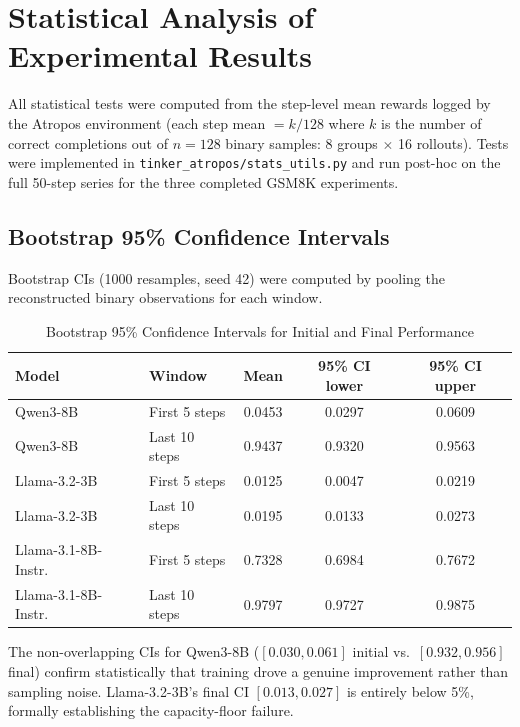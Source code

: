 \documentclass[12pt,a4paper]{report}
\theoremstyle{definition}
\begin{document}
\section{Statistical Analysis of Experimental Results}
\label{sec:statistical_analysis}

All statistical tests were computed from the step-level mean rewards logged by the Atropos environment (each step mean $= k/128$ where $k$ is the number of correct completions out of $n{=}128$ binary samples: 8 groups $\times$ 16 rollouts).  Tests were implemented in \texttt{tinker\_atropos/stats\_utils.py} and run post-hoc on the full 50-step series for the three completed GSM8K experiments.

\subsection{Bootstrap 95\% Confidence Intervals}

Bootstrap CIs (1000 resamples, seed 42) were computed by pooling the reconstructed binary observations for each window.

\begin{table}[htbp]
\centering
\caption{Bootstrap 95\% Confidence Intervals for Initial and Final Performance}
\label{tab:bootstrap_ci}
\begin{tabular}{llccc}
\toprule
\textbf{Model} & \textbf{Window} & \textbf{Mean} & \textbf{95\% CI lower} & \textbf{95\% CI upper} \\
\midrule
Qwen3-8B           & First 5 steps   & 0.0453 & 0.0297 & 0.0609 \\
Qwen3-8B           & Last 10 steps   & 0.9437 & 0.9320 & 0.9563 \\
\addlinespace
Llama-3.2-3B       & First 5 steps   & 0.0125 & 0.0047 & 0.0219 \\
Llama-3.2-3B       & Last 10 steps   & 0.0195 & 0.0133 & 0.0273 \\
\addlinespace
Llama-3.1-8B-Instr.& First 5 steps   & 0.7328 & 0.6984 & 0.7672 \\
Llama-3.1-8B-Instr.& Last 10 steps   & 0.9797 & 0.9727 & 0.9875 \\
\bottomrule
\end{tabular}
\end{table}

The non-overlapping CIs for Qwen3-8B ($[0.030, 0.061]$ initial vs.\ $[0.932, 0.956]$ final) confirm statistically that training drove a genuine improvement rather than sampling noise.  Llama-3.2-3B's final CI $[0.013, 0.027]$ is entirely below 5\%, formally establishing the capacity-floor failure.
\end{document}
